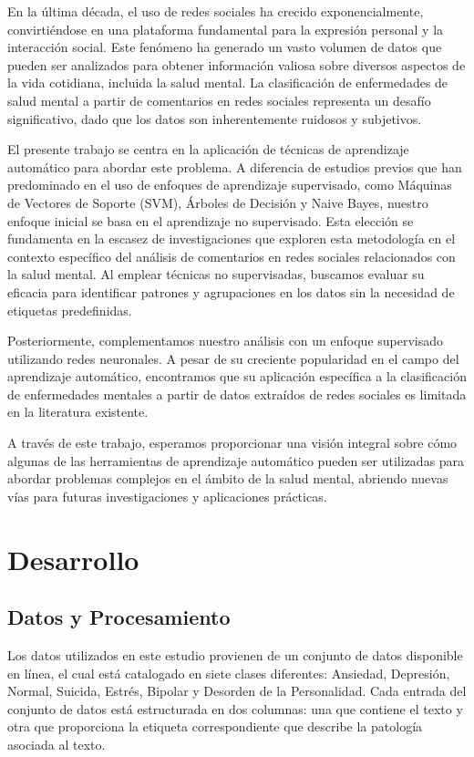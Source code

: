 \documentclass[
10pt, %
a4paper, %
oneside, %
headinclude,footinclude, %
BCOR5mm, %
]{scrartcl}
\begin{document}
En la última década, el uso de redes sociales ha crecido exponencialmente, convirtiéndose en una plataforma fundamental 
para la expresión personal y la interacción social. Este fenómeno ha generado un vasto volumen de datos que pueden ser analizados 
para obtener información valiosa sobre diversos aspectos de la vida cotidiana, incluida la salud mental. La clasificación de enfermedades 
de salud mental a partir de comentarios en redes sociales representa un desafío significativo, dado que los datos son inherentemente ruidosos y subjetivos.

El presente trabajo se centra en la aplicación de técnicas de aprendizaje automático para abordar este problema. 
A diferencia de estudios previos que han predominado en el uso de enfoques de aprendizaje supervisado, como Máquinas de Vectores de Soporte (SVM), 
Árboles de Decisión y Naive Bayes, nuestro enfoque inicial se basa en el aprendizaje no supervisado. Esta elección se fundamenta en la escasez de investigaciones 
que exploren esta metodología en el contexto específico del análisis de comentarios en redes sociales relacionados con la salud mental. Al emplear técnicas no supervisadas, 
buscamos evaluar su eficacia para identificar patrones y agrupaciones en los datos sin la necesidad de etiquetas predefinidas.

Posteriormente, complementamos nuestro análisis con un enfoque supervisado utilizando redes neuronales. A pesar de su creciente popularidad en el campo del aprendizaje automático, 
encontramos que su aplicación específica a la clasificación de enfermedades mentales a partir de datos extraídos de redes sociales es limitada en la literatura existente. 
 
A través de este trabajo, esperamos proporcionar una visión integral sobre cómo algunas de las herramientas de aprendizaje automático pueden ser utilizadas para abordar problemas complejos en el ámbito de la salud mental, abriendo nuevas vías para futuras investigaciones y aplicaciones prácticas.

\section{Desarrollo}

\subsection{Datos y Procesamiento}

Los datos utilizados en este estudio provienen de un conjunto de datos disponible en línea, el cual está catalogado en siete clases diferentes: 
Ansiedad, Depresión, Normal, Suicida, Estrés, Bipolar y Desorden de la Personalidad. Cada entrada del conjunto de datos está estructurada en dos columnas: 
una que contiene el texto y otra que proporciona la etiqueta correspondiente que describe la patología asociada al texto.
\end{document}
